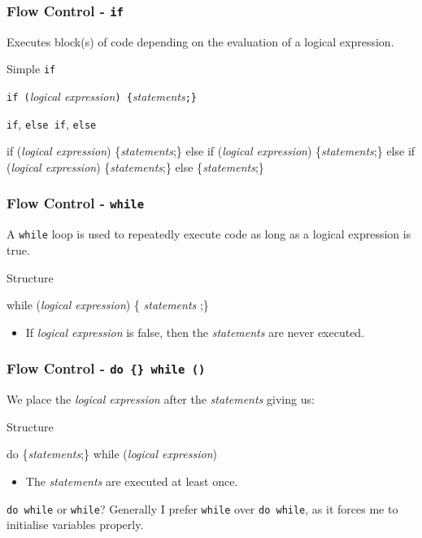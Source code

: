\documentclass[table]{beamer}
\newif\ifschigh\schighfalse
\newcommand{\kw}[1]{\ifschigh\textcolor{red}{#1}\else\textcolor{keyword}{#1}\fi}
\begin{document}
\begin{frame}[fragile]
\frametitle{Flow Control - {\tt if}}
Executes block(s) of code depending on the evaluation of a logical expression.
\begin{block}{Simple {\tt if}}
\begin{center}{\tt \kw{if} (}\emph{logical expression}{\tt ) \{}\emph{statements}{\tt ;\}}\end{center}
\end{block}

\begin{block}{{\tt if}, {\tt else if}, {\tt else}}
\begin{semiverbatim}
   \kw{if} (\emph{logical expression})
      \{\emph{statements};\}
   \kw{else if} (\emph{logical expression})
      \{\emph{statements};\}
   \kw{else if} (\emph{logical expression})
      \{\emph{statements};\}
   \kw{else}
      \{\emph{statements};\}
\end{semiverbatim}
\end{block}
\end{frame}

\begin{frame}[fragile]
\frametitle{Flow Control - {\tt while}}
A \kw{\tt while} loop is used to repeatedly execute code as long as a logical expression is true.

\begin{block}{Structure}
\begin{semiverbatim}
   \kw{while} (\emph{logical expression})
      \{ \emph{statements} ;\}
\end{semiverbatim}
\end{block}
\begin{itemize}
\item If \emph{logical expression} is false, then the \emph{statements} are never executed.
\end{itemize}
\end{frame}

\begin{frame}[fragile]
\frametitle{Flow Control - {\tt do \{\} while ()}}
We place the \emph{logical expression} after the \emph{statements} giving us:
\begin{block}{Structure}
\begin{semiverbatim}
   \kw{do} \{\emph{statements};\}
   \kw{while} (\emph{logical expression})
\end{semiverbatim}
\end{block}
\begin{itemize}
\item The \emph{statements} are executed at least once.
\end{itemize}
\begin{exampleblock}{{\tt do while} or {\tt while}?}
Generally I prefer {\tt \kw{while}} over {\tt \kw{do while}}, as it forces me to initialise variables properly.
\end{exampleblock}
\end{frame}
\end{document}
